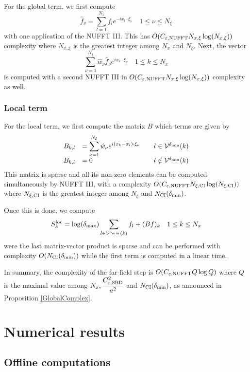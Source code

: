 \documentclass[11pt,a4paper]{article}
\begin{document}
For the global term, we first compute 
\[ \hat{f}_{\nu} = \sum_{l=1}^{N_x} f_l e^{-ix_l\cdot \xi_\nu} \quad 1 \leq \nu \leq N_{\xi}\]
with one application of the NUFFT III. This has $O(C_{\varepsilon,\textup{NUFFT}} N_{x,\xi} \log(N_{x,\xi}))$ complexity where $N_{x,\xi}$ is the greatest integer among $N_x$ and $N_\xi$. Next, the vector 
\[\sum_{\nu=1}^{N_{\xi}}\hat{w}_{\nu} \hat{f}_{\nu} e^{i x_k \cdot \xi_\nu} \quad 1 \leq k \leq N_x \]
is computed with a second NUFFT III in $O(C_{\varepsilon,\textup{NUFFT}} N_{x,\xi} \log(N_{x,\xi}))$ complexity as well.

\subsubsection*{Local term}

For the local term, we first compute the matrix $B$ which terms are given by 
\[\begin{array}{rll}
B_{k,l} &= \displaystyle\sum_{\nu=1}^{N_\xi} \hat{w}_{\nu}e^{i(x_k - x_l)\cdot \xi_\nu} &\quad l \in \mathcal{V}^{\delta_{\min}}(k)\\
B_{k,l} &= 0 &\quad l \notin \mathcal{V}^{\delta_{\min}}(k)\\
\end{array}\] 
This matrix is sparse and all its non-zero elements can be computed simultaneously by NUFFT III, with a complexity $O(C_{\varepsilon,\textup{NUFFT}} N_{\xi,\textup{CI}} \log(N_{\xi,\textup{CI}}))$ where $N_{\xi,\textup{CI}}$ is the greatest integer among $N_\xi$ and $N_{\textup{CI}}(\delta_{\min})$.

Once this is done, we compute 
\[S^{\text{loc}}_k = \log(\delta_{\max})\sum_{l\in \mathcal{V}^{\delta_{\min}}(k)}f_l +  (Bf)_{k}\quad 1\leq k \leq N_x\]
were the last matrix-vector product is sparse and can be performed with complexity $O(N_{\textup{CI}}(\delta_{\min}))$ while the first term is computed in a linear time.

In summary, the complexity of the far-field step is $O(C_{\varepsilon,\textup{NUFFT}} Q \log Q)$ where $Q$ is the maximal value among $N_x, \dfrac{C_{\varepsilon,\textup{SBD}}^2}{a^2}$ and $N_{\textup{CI}}(\delta_{\min})$, as announced in Proposition \ref{GlobalComplex}.
\section{Numerical results}

\subsection{Offline computations}
\end{document}
